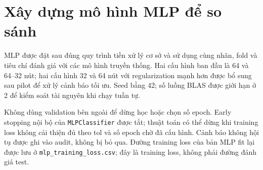 \section{Xây dựng mô hình MLP để so sánh}
\label{sec:4_6}
MLP được đặt sau đúng quy trình tiền xử lý cơ sở và sử dụng cùng nhãn, fold và tiêu chí đánh giá với các mô hình truyền thống. Hai cấu hình ban đầu là 64 và 64--32 nút; hai cấu hình 32 và 64 nút với regularization mạnh hơn được bổ sung sau pilot để xử lý cảnh báo tối ưu. Seed bằng 42; số luồng BLAS được giới hạn ở 2 để kiểm soát tài nguyên khi chạy tuần tự.

Không dùng validation bên ngoài để dừng học hoặc chọn số epoch. Early stopping nội bộ của \texttt{MLPClassifier} được tắt; thuật toán có thể dừng khi training loss không cải thiện đủ theo tol và số epoch chờ đã cấu hình. Cảnh báo không hội tụ được ghi vào audit, không bị bỏ qua. Đường training loss của bản MLP fit lại được lưu ở \texttt{mlp\_training\_loss.csv}; đây là training loss, không phải đường đánh giá test.
